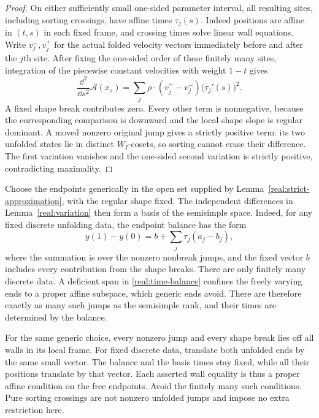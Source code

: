 \begin{proof}
On either sufficiently small one-sided parameter interval, all
resulting sites, including sorting crossings, have affine times
$\tau_j(s)$.  Indeed positions are affine in $(t,s)$ in each fixed
frame, and crossing times solve linear wall equations.  Write
$v_j^-,v_j^+$ for the actual folded velocity vectors immediately
before and after the $j$th site.  After fixing the one-sided order
of these finitely many sites, integration of the piecewise constant
velocities with weight $1-t$ gives
\begin{equation}\label{real:second-variation}
 \frac{\dd^2}{\dd s^2}\mathcal A(x_s)
 =\sum_j \rho\cdot(v_j^+-v_j^-)
                 \bigl(\tau_j'(s)\bigr)^2.
\end{equation}
A fixed shape break contributes zero.  Every other term is
nonnegative, because the corresponding comparison is downward and
the local shape slope is regular dominant.  A moved nonzero original
jump gives a strictly positive term: its two unfolded states lie in
distinct $W_I$-cosets, so sorting cannot erase their difference.
The first variation vanishes and the one-sided second variation is
strictly positive, contradicting maximality.
\end{proof}

Choose the endpoints generically in the open set supplied by
Lemma~\ref{real:strict-approximation}, with the regular shape fixed.
The independent differences in Lemma~\ref{real:variation} then form
a basis of the semisimple space.  Indeed, for any fixed discrete
unfolding data, the endpoint balance has the form
\begin{equation}\label{real:time-balance}
 y(1)-y(0)=b+\sum_j \tau_j(a_j-b_j),
\end{equation}
where the summation is over the nonzero nonbreak jumps, and the
fixed vector $b$ includes every contribution from the shape breaks.
There are only finitely many discrete data.  A deficient span in
\eqref{real:time-balance} confines the freely varying ends to a
proper affine subspace, which generic ends avoid.  There are therefore
exactly as many such jumps as the semisimple rank, and their times
are determined by the balance.

For the same generic choice, every nonzero jump and every shape break
lies off all walls in its local frame.  For fixed discrete data,
translate both unfolded ends by the same small vector.  The balance
and the basis times stay fixed, while all their positions translate
by that vector.  Each asserted wall equality is thus a proper affine
condition on the free endpoints.  Avoid the finitely many such
conditions.  Pure sorting crossings are not nonzero unfolded jumps
and impose no extra restriction here.


